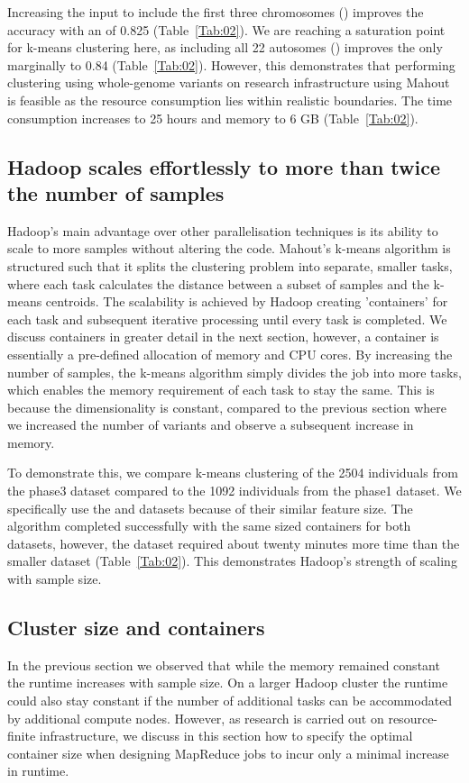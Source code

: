 \documentclass{bioinfo}
\begin{document}
Increasing the input to include the first three chromosomes (\ThreePhasethree{}) improves the accuracy with an \ARI{} of 0.825 (Table~\ref{Tab:02}).
We are reaching a saturation point for k-means clustering here, as including all 22 autosomes (\FullPhasethree{}) improves the \ARI{} only marginally to 0.84 (Table~\ref{Tab:02}).
However, this demonstrates that performing clustering using whole-genome variants on research infrastructure using Mahout is feasible as the resource consumption lies within realistic boundaries. 
The time consumption increases to 25 hours and memory to 6 GB (Table~\ref{Tab:02}). 


\subsection*{Hadoop scales effortlessly to more than twice the number of samples}
Hadoop's main advantage over other parallelisation techniques is its ability to scale to more samples without altering the code. 
Mahout's k-means algorithm is structured such that it splits the clustering problem into separate, smaller tasks, where each task calculates the distance between a subset of samples and the k-means centroids. 
The scalability is achieved by Hadoop creating 'containers' for each task and subsequent iterative processing until every task is completed.
We discuss containers in greater detail in the next section, however, a container is essentially a pre-defined allocation of memory and CPU cores.
By increasing the number of samples, the k-means algorithm simply divides the job into more tasks, which enables the memory requirement of each task to stay the same.
This is because the dimensionality is constant, compared to the previous section where we increased the number of variants and observe a subsequent increase in memory. 

To demonstrate this, we compare k-means clustering of the 2504 individuals from the phase3 dataset compared to the 1092 individuals from the phase1 dataset.
We specifically use the \SevenPhaseone{} and \ThreePhasethree{} datasets because of their similar feature size.
The algorithm completed successfully with the same sized containers for both datasets, however, the \ThreePhasethree{} dataset required about twenty minutes more time than the smaller \SevenPhaseone{} dataset (Table~\ref{Tab:02}). 
This demonstrates Hadoop's strength of scaling with sample size. 


\subsection*{Cluster size and containers}
In the previous section we observed that while the memory remained constant the runtime increases with sample size. 
On a larger Hadoop cluster the runtime could also stay constant if the number of additional tasks can be accommodated by additional compute nodes. 
However, as research is carried out on resource-finite infrastructure, we discuss in this section how to specify the optimal container size when designing MapReduce jobs to incur only a minimal increase in runtime. 
\end{document}
